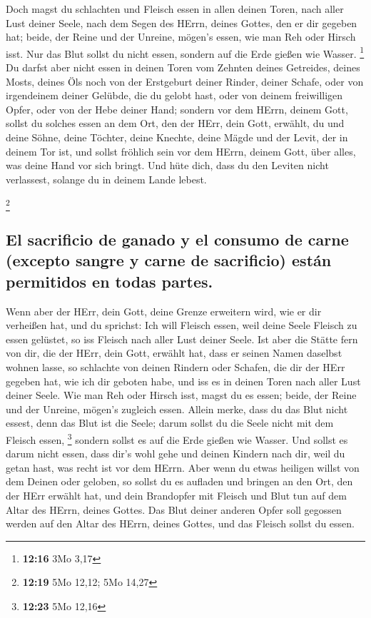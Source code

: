  Doch magst du schlachten und Fleisch essen in allen
deinen Toren, nach aller Lust deiner Seele, nach dem Segen des HErrn,
deines Gottes, den er dir gegeben hat; beide, der Reine und der Unreine,
mögen's essen, wie man Reh oder Hirsch isst.  Nur das
Blut sollst du nicht essen, sondern auf die Erde gießen wie Wasser.
\footnote{\textbf{12:16} 3Mo 3,17}  Du darfst aber nicht
essen in deinen Toren vom Zehnten deines Getreides, deines Mosts, deines
Öls noch von der Erstgeburt deiner Rinder, deiner Schafe, oder von
irgendeinem deiner Gelübde, die du gelobt hast, oder von deinem
freiwilligen Opfer, oder von der Hebe deiner Hand; 
sondern vor dem HErrn, deinem Gott, sollst du solches essen an dem Ort,
den der HErr, dein Gott, erwählt, du und deine Söhne, deine Töchter,
deine Knechte, deine Mägde und der Levit, der in deinem Tor ist, und
sollst fröhlich sein vor dem HErrn, deinem Gott, über alles, was deine
Hand vor sich bringt.  Und hüte dich, dass du den Leviten
nicht verlassest, solange du in deinem Lande lebest.

\footnote{\textbf{12:19} 5Mo 12,12; 5Mo 14,27}

\hypertarget{el-sacrificio-de-ganado-y-el-consumo-de-carne-excepto-sangre-y-carne-de-sacrificio-estuxe1n-permitidos-en-todas-partes.}{%
\subsection{El sacrificio de ganado y el consumo de carne (excepto
sangre y carne de sacrificio) están permitidos en todas
partes.}\label{el-sacrificio-de-ganado-y-el-consumo-de-carne-excepto-sangre-y-carne-de-sacrificio-estuxe1n-permitidos-en-todas-partes.}}

 Wenn aber der HErr, dein Gott, deine Grenze erweitern
wird, wie er dir verheißen hat, und du sprichst: Ich will Fleisch essen,
weil deine Seele Fleisch zu essen gelüstet, so iss Fleisch nach aller
Lust deiner Seele.  Ist aber die Stätte fern von dir, die
der HErr, dein Gott, erwählt hat, dass er seinen Namen daselbst wohnen
lasse, so schlachte von deinen Rindern oder Schafen, die dir der HErr
gegeben hat, wie ich dir geboten habe, und iss es in deinen Toren nach
aller Lust deiner Seele.  Wie man Reh oder Hirsch isst,
magst du es essen; beide, der Reine und der Unreine, mögen's zugleich
essen.  Allein merke, dass du das Blut nicht essest, denn
das Blut ist die Seele; darum sollst du die Seele nicht mit dem Fleisch
essen, \footnote{\textbf{12:23} 5Mo 12,16}  sondern
sollst es auf die Erde gießen wie Wasser.  Und sollst es
darum nicht essen, dass dir's wohl gehe und deinen Kindern nach dir,
weil du getan hast, was recht ist vor dem HErrn.  Aber
wenn du etwas heiligen willst von dem Deinen oder geloben, so sollst du
es aufladen und bringen an den Ort, den der HErr erwählt hat,
 und dein Brandopfer mit Fleisch und Blut tun auf dem
Altar des HErrn, deines Gottes. Das Blut deiner anderen Opfer soll
gegossen werden auf den Altar des HErrn, deines Gottes, und das Fleisch
sollst du essen.

